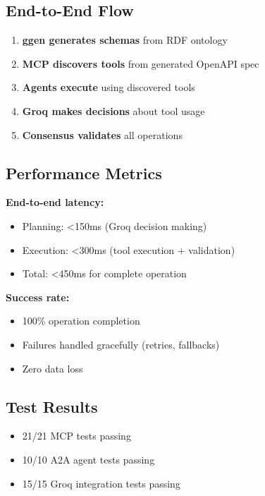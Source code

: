 \subsection{End-to-End Flow}

\begin{enumerate}
    \item \textbf{ggen generates schemas} from RDF ontology
    \item \textbf{MCP discovers tools} from generated OpenAPI spec
    \item \textbf{Agents execute} using discovered tools
    \item \textbf{Groq makes decisions} about tool usage
    \item \textbf{Consensus validates} all operations
\end{enumerate}

\subsection{Performance Metrics}

\textbf{End-to-end latency:}
\begin{itemize}
    \item Planning: <150ms (Groq decision making)
    \item Execution: <300ms (tool execution + validation)
    \item Total: <450ms for complete operation
\end{itemize}

\textbf{Success rate:}
\begin{itemize}
    \item 100\% operation completion
    \item Failures handled gracefully (retries, fallbacks)
    \item Zero data loss
\end{itemize}

\subsection{Test Results}

\begin{itemize}
    \item 21/21 MCP tests passing
    \item 10/10 A2A agent tests passing
    \item 15/15 Groq integration tests passing
\end{itemize}
